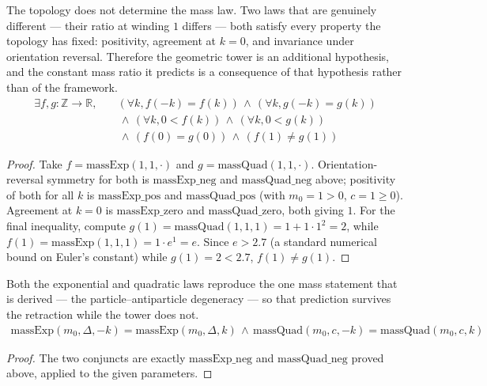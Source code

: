 \begin{theorem}
The topology does not determine the mass law.  Two laws that are genuinely different — their ratio at winding $1$ differs — both satisfy every property the topology has fixed: positivity, agreement at $k=0$, and invariance under orientation reversal.  Therefore the geometric tower is an additional hypothesis, and the constant mass ratio it predicts is a consequence of that hypothesis rather than of the framework.
\begin{align*}
\exists f, g : \mathbb{Z} \to \mathbb{R}, \quad &(\forall k, f(-k) = f(k)) \,\wedge\, (\forall k, g(-k) = g(k)) \\
&\,\wedge\, (\forall k, 0 < f(k)) \,\wedge\, (\forall k, 0 < g(k)) \\
&\,\wedge\, (f(0) = g(0)) \,\wedge\, (f(1) \neq g(1))
\end{align*}
\begin{proof}
Take $f=\text{massExp}(1,1,\cdot)$ and $g=\text{massQuad}(1,1,\cdot)$. Orientation-reversal symmetry for both is $\text{massExp\_neg}$ and $\text{massQuad\_neg}$ above; positivity of both for all $k$ is $\text{massExp\_pos}$ and $\text{massQuad\_pos}$ (with $m_0=1>0$, $c=1\geq0$). Agreement at $k=0$ is $\text{massExp\_zero}$ and $\text{massQuad\_zero}$, both giving $1$. For the final inequality, compute $g(1)=\text{massQuad}(1,1,1) = 1+1\cdot1^2=2$, while $f(1)=\text{massExp}(1,1,1)=1\cdot e^{1}=e$. Since $e>2.7$ (a standard numerical bound on Euler's constant) while $g(1)=2<2.7$, $f(1)\neq g(1)$.
\end{proof}
\end{theorem}

\begin{theorem}
Both the exponential and quadratic laws reproduce the one mass statement that is derived — the particle–antiparticle degeneracy — so that prediction survives the retraction while the tower does not.
\begin{align*}
\text{massExp}(m_0, \Delta, -k) = \text{massExp}(m_0, \Delta, k) \,\wedge\, \text{massQuad}(m_0, c, -k) = \text{massQuad}(m_0, c, k)
\end{align*}
\begin{proof}
The two conjuncts are exactly $\text{massExp\_neg}$ and $\text{massQuad\_neg}$ proved above, applied to the given parameters.
\end{proof}
\end{theorem}


